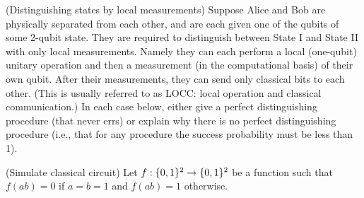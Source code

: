 \begin{questions}
  \question (Distinguishing states by local measurements) Suppose
  Alice and Bob are physically separated from each other, and are each
  given one of the qubits of some 2-qubit state. They are required to
  distinguish between State I and State II with only local
  measurements. Namely they can each perform a local (one-qubit)
  unitary operation and then a measurement (in the computational
  basis) of their own qubit. After their measurements, they can send
  only classical bits to each other. (This is usually referred to as
  LOCC: local operation and classical communication.)  In each case
  below, either give a perfect distinguishing procedure (that never
  errs) or explain why there is no perfect distinguishing procedure
  (i.e., that for any procedure the success probability must be less
  than 1).

  \question (Simulate classical circuit) Let $f: \{0,1\}^2 \to \{0,1\}^2$ be
  a function such that $f(ab) = 0$ if $a=b=1$ and $f(ab) =1$
  otherwise.

\end{questions}



